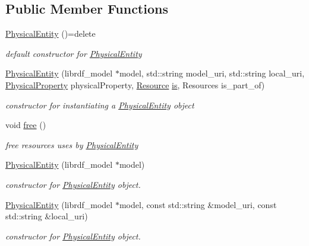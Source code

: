 \subsection*{Public Member Functions}
\begin{DoxyCompactItemize}
\item 
\hyperlink{classomexmeta_1_1PhysicalEntity_a9d29348a080c64f91ff6ec184fd45ece}{Physical\+Entity} ()=delete
\begin{DoxyCompactList}\small\item\em default constructor for \hyperlink{classomexmeta_1_1PhysicalEntity}{Physical\+Entity} \end{DoxyCompactList}\item 
\hyperlink{classomexmeta_1_1PhysicalEntity_a0341918665af91cacdb4481d037c42d2}{Physical\+Entity} (librdf\+\_\+model $\ast$model, std\+::string model\+\_\+uri, std\+::string local\+\_\+uri, \hyperlink{classomexmeta_1_1PhysicalProperty}{Physical\+Property} physical\+Property, \hyperlink{classomexmeta_1_1Resource}{Resource} \hyperlink{classomexmeta_1_1PhysicalEntity_a2498e9b0b11a00200e47332c4515b1f1}{is}, Resources is\+\_\+part\+\_\+of)
\begin{DoxyCompactList}\small\item\em constructor for instantiating a \hyperlink{classomexmeta_1_1PhysicalEntity}{Physical\+Entity} object \end{DoxyCompactList}\item 
void \hyperlink{classomexmeta_1_1PhysicalEntity_a6fd4acd7255a01322c4a53d3e84df0ba}{free} ()
\begin{DoxyCompactList}\small\item\em free resources uses by \hyperlink{classomexmeta_1_1PhysicalEntity}{Physical\+Entity} \end{DoxyCompactList}\item 
\hyperlink{classomexmeta_1_1PhysicalEntity_a6bbbce71778e374de7d4e5e2e674fc2b}{Physical\+Entity} (librdf\+\_\+model $\ast$model)
\begin{DoxyCompactList}\small\item\em constructor for \hyperlink{classomexmeta_1_1PhysicalEntity}{Physical\+Entity} object. \end{DoxyCompactList}\item 
\hyperlink{classomexmeta_1_1PhysicalEntity_a5f583e60ad44bbb3dfcd11fdc6bc72cc}{Physical\+Entity} (librdf\+\_\+model $\ast$model, const std\+::string \&model\+\_\+uri, const std\+::string \&local\+\_\+uri)
\begin{DoxyCompactList}\small\item\em constructor for \hyperlink{classomexmeta_1_1PhysicalEntity}{Physical\+Entity} object. \end{DoxyCompactList}\item 

\end{DoxyCompactItemize}
